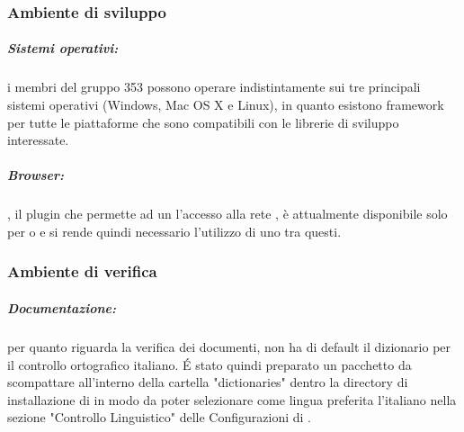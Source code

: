 	\subsubsection{Ambiente di sviluppo}
	\subparagraph{Sistemi operativi:} i membri del gruppo 353 possono operare indistintamente sui tre principali sistemi operativi (Windows, Mac OS X e Linux), in quanto esistono framework per tutte le piattaforme che sono compatibili con le librerie di sviluppo interessate.
	\subparagraph{Browser:} , il plugin che permette ad un  l'accesso alla rete , è attualmente disponibile solo per  o  e si rende quindi necessario l'utilizzo di uno tra questi.
	\subsubsection{Ambiente di verifica}
	\subparagraph{Documentazione:} per quanto riguarda la verifica dei documenti,  non
		ha di default il dizionario per il controllo ortografico italiano. \'{E}
		stato quindi preparato un pacchetto da scompattare all'interno della cartella
		"dictionaries" dentro la directory di installazione di  in modo da
		poter selezionare come lingua preferita l'italiano nella sezione "Controllo
		Linguistico" delle Configurazioni di .

